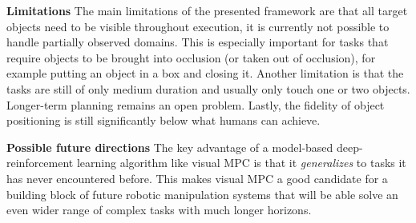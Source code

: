\documentclass[10pt,journal,compsoc]{IEEEtran}
\begin{document}
\noindent \textbf{Limitations}
The main limitations of the presented framework are that all target objects need to be visible throughout execution, it is currently not possible to handle partially observed domains. This is especially important for tasks that require objects to be brought into occlusion (or taken out of occlusion), for example putting an object in a box and closing it. Another limitation is that the tasks are still of only medium duration and usually only touch one or two objects. Longer-term planning remains an open problem. Lastly, the fidelity of object positioning is still significantly below what humans can achieve.

\noindent \textbf{Possible future directions}
The key advantage of a model-based deep-reinforcement learning algorithm like visual MPC is that it \emph{generalizes} to tasks it has never encountered before. This makes visual MPC a good candidate for a building block of future robotic manipulation systems that will be able solve an even wider range of complex tasks with much longer horizons. 


\ifCLASSOPTIONcompsoc
\else
\fi




\ifCLASSOPTIONcaptionsoff
  \newpage
\fi



\end{document}
